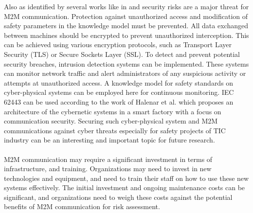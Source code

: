 Also as identified by several works like in \cite{Kadena2017} and \cite{TUNA2017142} security risks are a major threat for M2M communication. Protection against unauthorized access and modification of safety parameters in the knowledge model must be prevented. All data exchanged between machines should be encrypted to prevent unauthorized interception. This can be achieved using various encryption protocols, such as Transport Layer Security (TLS) or Secure Sockets Layer (SSL). To detect and prevent potential security breaches, intrusion detection systems can be implemented. These systems can monitor network traffic and alert administrators of any suspicious activity or attempts at unauthorized access. A knowledge model for safety standards on cyber-physical systems can be employed here for continuous monitoring. IEC 62443 can be used according to the work of Halenar et al. \cite{Halenar2023} which proposes an architecture of the cybernetic systems in a smart
factory with a focus on communication security. Securing such cyber-physical system and M2M communications against cyber threats especially for safety projects of TIC industry can be an interesting and important topic for future research.

\paragraph{} M2M communication may require a significant investment in terms of infrastructure, and training. Organizations may need to invest in new technologies and equipment, and need to train their staff on how to use these new systems effectively. The initial investment and ongoing maintenance costs can be significant, and organizations need to weigh these costs against the potential benefits of M2M communication for risk assessment.